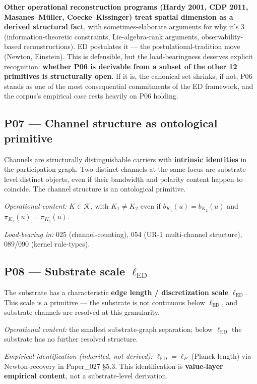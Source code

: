 \documentclass[11pt,a4paper]{article}
\begin{document}
\textbf{Other operational reconstruction programs (Hardy 2001, CDP 2011, Masanes--M\"uller, Coecke--Kissinger) treat spatial dimension as a derived structural fact}, with sometimes-elaborate arguments for why it's 3 (information-theoretic constraints, Lie-algebra-rank arguments, observability-based reconstructions). ED postulates it --- the postulational-tradition move (Newton, Einstein). This is defensible, but the load-bearingness deserves explicit recognition: \textbf{whether P06 is derivable from a subset of the other 12 primitives is structurally open}. If it is, the canonical set shrinks; if not, P06 stands as one of the most consequential commitments of the ED framework, and the corpus's empirical case rests heavily on P06 holding.

\subsection*{P07 --- Channel structure as ontological primitive}

Channels are structurally distinguishable carriers with \textbf{intrinsic identities} in the participation graph. Two distinct channels at the same locus are substrate-level distinct objects, even if their bandwidth and polarity content happen to coincide. The channel structure is an ontological primitive.

\emph{Operational content:} $K \in \mathcal{K}$, with $K_1 \neq K_2$ even if $b_{K_1}(u) = b_{K_2}(u)$ and $\pi_{K_1}(u) = \pi_{K_2}(u)$.

\emph{Load-bearing in:} 025 (channel-counting), 054 (UR-1 multi-channel structure), 089/090 (kernel rule-types).

\subsection*{P08 --- Substrate scale $\ell_\mathrm{ED}$}

The substrate has a characteristic \textbf{edge length / discretization scale} $\ell_\mathrm{ED}$. This scale is a primitive --- the substrate is not continuous below $\ell_\mathrm{ED}$, and substrate channels are resolved at this granularity.

\emph{Operational content:} the smallest substrate-graph separation; below $\ell_\mathrm{ED}$ the substrate has no further resolved structure.

\emph{Empirical identification (inherited, not derived):} $\ell_\mathrm{ED} = \ell_P$ (Planck length) via Newton-recovery in Paper\_027 \S5.3. This identification is \textbf{value-layer empirical content}, not a substrate-level derivation.
\end{document}
